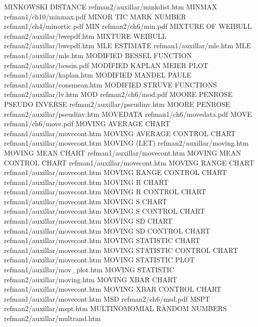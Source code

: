 MINKOWSKI DISTANCE                      refman2/auxillar/minkdist.htm
MINMAX                                  refman1/ch10/minmax.pdf
MINOR TIC MARK NUMBER                   refman1/ch4/minortic.pdf
MIN                                     refman2/ch6/min.pdf
MIXTURE OF WEIBULL                      refman2/auxillar/bwepdf.htm
MIXTURE WEIBULL                         refman2/auxillar/bwepdf.htm
MLE ESTIMATE                            refman1/auxillar/mle.htm
MLE                                     refman1/auxillar/mle.htm
MODIFIED BESSEL FUNCTION                refman2/auxillar/bessin.pdf
MODIFIED KAPLAN MEIER PLOT              refman1/auxillar/kaplan.htm
MODIFIED MANDEL PAULE                   refman1/auxillar/consmean.htm
MODIFIED STRUVE FUNCTIONS               refman2/auxillar/lv.htm
MOD                                     refman2/ch6/mod.pdf
MOORE PENROSE PSEUDO INVERSE            refman2/auxillar/pseudinv.htm
MOORE PENROSE                           refman2/auxillar/pseudinv.htm
MOVEDATA                                refman1/ch6/movedata.pdf
MOVE                                    refman1/ch6/move.pdf
MOVING AVERAGE CHART                    refman1/auxillar/movecont.htm
MOVING AVERAGE CONTROL CHART            refman1/auxillar/movecont.htm
MOVING (LET)                            refman2/auxillar/moving.htm
MOVING MEAN CHART                       refman1/auxillar/movecont.htm
MOVING MEAN CONTROL CHART               refman1/auxillar/movecont.htm
MOVING RANGE CHART                      refman1/auxillar/movecont.htm
MOVING RANGE CONTROL CHART              refman1/auxillar/movecont.htm
MOVING R CHART                          refman1/auxillar/movecont.htm
MOVING R CONTROL CHART                  refman1/auxillar/movecont.htm
MOVING S CHART                          refman1/auxillar/movecont.htm
MOVING S CONTROL CHART                  refman1/auxillar/movecont.htm
MOVING SD CHART                         refman1/auxillar/movecont.htm
MOVING SD CONTROL CHART                 refman1/auxillar/movecont.htm
MOVING STATISTIC CHART                  refman1/auxillar/movecont.htm
MOVING STATISTIC CONTROL CHART          refman1/auxillar/movecont.htm
MOVING STATISTIC PLOT                   refman1/auxillar/mov_plot.htm
MOVING STATISTIC                        refman2/auxillar/moving.htm
MOVING XBAR CHART                       refman1/auxillar/movecont.htm
MOVING XBAR CONTROL CHART               refman1/auxillar/movecont.htm
MSD                                     refman2/ch6/msd.pdf
MSPT                                    refman2/auxillar/mspt.htm
MULTINOMOMIAL RANDOM NUMBERS            refman2/auxillar/multrand.htm
